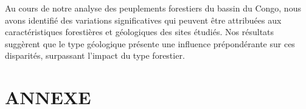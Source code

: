 \documentclass{article}
\begin{document}
Au cours de notre analyse des peuplements forestiers du bassin du Congo,
nous avons identifié des variations significatives qui peuvent être attribuées
aux caractéristiques forestières et géologiques des sites étudiés.
Nos résultats suggèrent que le type géologique présente une influence prépondérante sur ces disparités, 
surpassant l'impact du type forestier.



\newpage
\section{ANNEXE}



\end{document}
